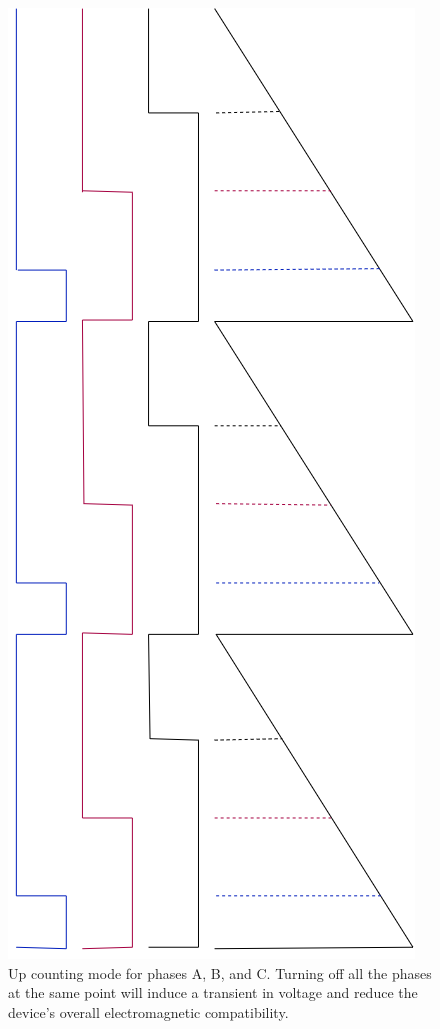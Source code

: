 \documentclass{article}
\begin{document}
		\begin{figure}[!h]
			\begin{center}
				\includegraphics[scale=0.4, angle=90]{UpCountingMode}
			\end{center}
			\caption{Up counting mode for phases A, B, and C.  Turning off all the phases at the same point will induce a transient in voltage and reduce the device's overall electromagnetic compatibility.}
			\label{fig:UpCountingMode}
		\end{figure}
	
\end{document}
